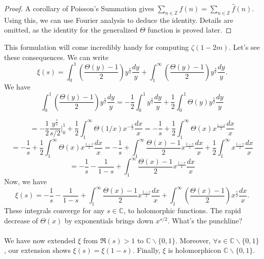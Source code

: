 \begin{proof}
    A corollary of Poisson's Summation gives $\sum_{n\in\mathbb{Z}}f(n)=\sum_{n\in\mathbb{Z}}\hat{f}(n)$.
    Using this, we can use Fourier analysis to deduce the identity. Details are omitted, 
    as the identity for the generalized $\Theta$ function is proved later.
\end{proof}
This formulation will come incredibly handy for computing $\zeta(1-2m)$. 
Let's see these consequences. We can write
\[
    \xi(s)=\int_0^1(\frac{\Theta(y)-1}{2})y^{\frac{s}{2}}\frac{dy}{y}+\int_1^{\infty}
    (\frac{\Theta(y)-1}{2})y^{\frac{s}{2}}\frac{dy}{y}.
\]
We have 
\[
    \int_0^1(\frac{\Theta(y)-1}{2})y^{\frac{s}{2}}\frac{dy}{y} = 
    -\frac{1}{2}\int_0^1y^{\frac{s}{2}}\frac{dy}{y}+\frac{1}{2}\int_0^1\Theta(y)y^{\frac{5}{2}}\frac{dy}{y}    
\]
    
\[
    =-\frac{1}{2}\frac{y^{\frac{s}{2}}}{s/2}\bigg |_0^1+\frac{1}{2}\int_1^{\infty}\Theta(1/x)x^{-\frac{s}{2}}\frac{dx}{x}
    =-\frac{1}{s}+\frac{1}{2}\int_1^{\infty}\Theta(x)x^{\frac{1-s}{2}}\frac{dx}{x}    
\]
\[
    =-\frac{1}{s}+\frac{1}{2}\int_1^{\infty}\Theta(x)x^{\frac{1-s}{2}}\frac{dx}{x}
    =-\frac{1}{s}+ \int_1^{\infty}\frac{\Theta(x)-1}{2}x^{\frac{1-s}{2}}\frac{dx}{x}
    +\frac{1}{2}\int_1^{\infty}x^{\frac{1-s}{2}}\frac{dx}{x}
\]
\[
    =-\frac{1}{s}-\frac{1}{1-s}+\int_1^{\infty}\frac{\Theta(x)-1}{2}x^{\frac{1-s}{2}}\frac{dx}{x}
\]  
Now, we have 
\[
    \xi(s)=  -\frac{1}{s}-\frac{1}{1-s}+\int_1^{\infty}\frac{\Theta(x)-1}{2}x^{\frac{1-s}{2}}\frac{dx}{x}
    +\int_1^{\infty}(\frac{\Theta(x)-1}{2})x^{\frac{s}{2}}\frac{dx}{x}.
\]
These integrals converge for any $s\in\mathbb{C}$, to holomorphic functions. 
The rapid decrease of $\Theta(x)$ by exponentials brings down $x^{s/2}$. What's the punchline?\\\\
We have now extended $\xi$ from $\Re(s)>1$ to $\mathbb{C}\backslash\{0,1\}$. Moreover, 
$\forall s\in \mathbb{C}\backslash\{0,1\}$, our extension shows $\xi(s)=\xi(1-s)$. Finally, 
$\xi$ is holomorphicon $\mathbb{C}\backslash\{0,1\}$.
